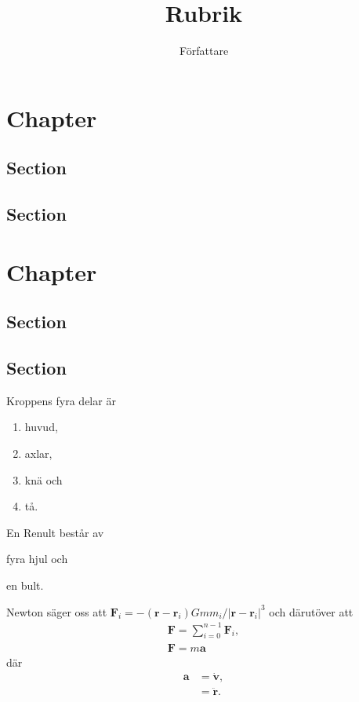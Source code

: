 \documentclass[a4paper, article, oneside]{memoir}
\title{Rubrik}
\author{Författare}
\begin{document}
\maketitle

\chapter{Chapter}
\section{Section}
\section{Section}

\chapter{Chapter}
\section{Section}
\section{Section}

Kroppens fyra delar är
\begin{enumerate}
\item huvud,
\item axlar,
\item knä och
\item tå.
\end{enumerate}
En Renult består av
\begin{enumerate*}[label=(\alph*)]
\item fyra hjul och
\item en bult.
\end{enumerate*}

Newton säger oss att $\mathbf{F}_i = -(\mathbf{r}-\mathbf{r}_i)Gmm_i/|\mathbf{r}-\mathbf{r}_i|^3$ och därutöver att
\begin{align}
\mathbf{F} = \sum_{i=0}^{n-1} \mathbf{F}_i, \\
\mathbf{F} = m\mathbf{a}
\end{align}
där
\begin{align}
\mathbf{a} &= \dot{\mathbf{v}}, \nonumber \\
&= \ddot{\mathbf{r}}.
\end{align}
\end{document}
